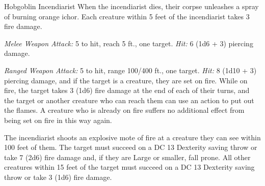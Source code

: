 \documentclass[10pt,a4paper,twoside,bg=print,twocolumn,openany,nodeprecatedcode]{dndbook}
\begin{document}
\begin{DndMonster}[float=t]{Hobgoblin Incendiarist}
\DndMonsterBasics[
armor-class = {15 (studded leather armor)},
hit-points = {\DndDice{6d8 + 6}},
speed = {30 ft.}
]
\DndMonsterAbilityScores[
 str = 10,
 dex = 16,
 con = 12,
 int = 10,
 wis = 16,
 cha = 10
]
\DndMonsterDetails[
skills = {Perception +5},
damage-resistances = {fire},
senses = {darkvision 60 ft., passive perception 15},
languages = {Common, Goblin, Infernal},
challenge = 1,
]
When the incendiarist dies, their corpse unleashes a spray of burning orange ichor. Each creature within 5 feet of the incendiarist takes 3 fire damage.

\textsl{Melee Weapon Attack:} 5 to hit, reach 5 ft., one target. \textsl{Hit:} 6 (1d6 + 3) piercing damage.

\textsl{Ranged Weapon Attack:} 5 to hit, range 100/400 ft., one target. \textsl{Hit:} 8 (1d10 + 3) piercing damage, and if the target is a creature, they are set on fire. While on fire, the target takes 3 (1d6) fire damage at the end of each of their turns, and the target or another creature who can reach them can use an action to put out the flames. A creature who is already on fire suffers no additional effect from being set on fire in this way again.

The incendiarist shoots an explosive mote of fire at a creature they can see within 100 feet of them. The target must succeed on a DC 13 Dexterity saving throw or take 7 (2d6) fire damage and, if they are Large or smaller, fall prone. All other creatures within 15 feet of the target must succeed on a DC 13 Dexterity saving throw or take 3 (1d6) fire damage.

\end{DndMonster}
\end{document}
